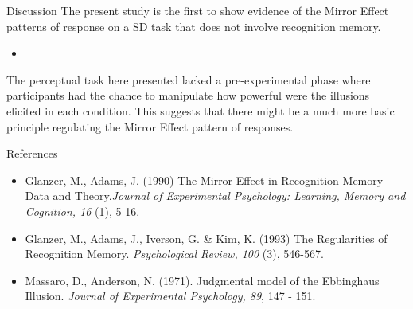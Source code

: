 \documentclass[final]{beamer}
\newlength{\onecolwid}
\begin{document}
\begin{frame}[t]
\begin{columns}[t]
\begin{column}{\onecolwid}
\begin{alertblock}{Discussion}
The present study is the first to show evidence of the Mirror Effect patterns of response on a SD task that does not involve recognition memory. 
\begin{itemize}
\item
\end{itemize}
The perceptual task here presented lacked a pre-experimental phase where participants had the chance to manipulate how powerful were the illusions elicited in each condition. This suggests that there might be a much more basic principle regulating the Mirror Effect pattern of responses.

\end{alertblock}


\begin{alertblock}{References}

\begin{itemize}
\item Glanzer, M., Adams, J. (1990) The Mirror Effect in Recognition Memory \: Data and Theory.\textit{Journal of Experimental Psychology: Learning, Memory and Cognition, 16} (1), 5-16.
\item Glanzer, M., Adams, J., Iverson, G. \& Kim, K. (1993) The Regularities of Recognition Memory. \textit{Psychological Review, 100} (3), 546-567.
\item Massaro, D., Anderson, N. (1971). Judgmental model of the Ebbinghaus Illusion. \textit{Journal of Experimental Psychology, 89}, 147 - 151.
\end{itemize}


\end{alertblock}




\end{column} %
\end{columns} %
\end{frame} %
\end{document}
